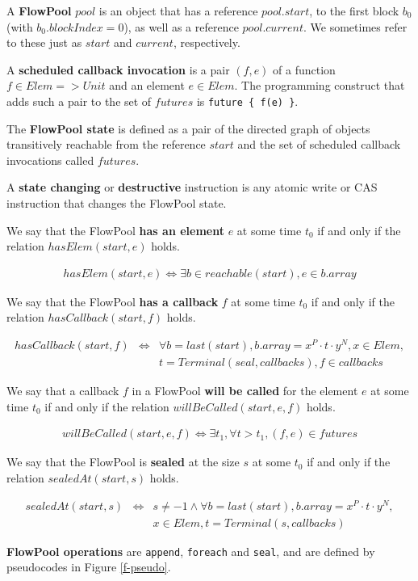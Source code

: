 \vspace{-1cm}
\begin{definitiontwo}[FlowPool]
A \textbf{FlowPool} $pool$ is an object that
has a reference $pool.start$, to the first block $b_0$ (with $b_0.blockIndex=0$),
as well as a reference $pool.current$.
We sometimes refer to these just as $start$ and $current$, respectively.

A \textbf{scheduled callback invocation} is a pair $(f, e)$ of a function
$f \in Elem => Unit$ and an element $e \in Elem$.
The programming construct that adds such a pair to the set of
$futures$ is \verb=future { f(e) }=.

The \textbf{FlowPool state} is defined as a pair of the directed graph of
objects transitively reachable from the reference $start$ and the set
of scheduled callback invocations called $futures$.

A \textbf{state changing} or \textbf{destructive} instruction is any
atomic write or CAS instruction that changes the FlowPool state.

We say that the FlowPool \textbf{has an element} $e$ at some time
$t_0$ if and only if the relation $hasElem(start, e)$ holds.

\vspace{-1cm}
\begin{align*}
hasElem(start, e) \Leftrightarrow \exists b \in reachable(start), e
\in b.array
\end{align*}

We say that the FlowPool \textbf{has a callback} $f$ at some time
$t_0$ if and only if the relation $hasCallback(start, f)$ holds.

\vspace{-1cm}
\begin{align*}
hasCallback(start, f) &\Leftrightarrow& \forall b = last(start), b.array
= x^P \cdot t \cdot y^N, x \in Elem, \\
& & t = Terminal(seal, callbacks), f \in callbacks
\end{align*}

We say that a callback $f$ in a FlowPool \textbf{will be called} for
the element $e$ at some time $t_0$ if and only if the relation
$willBeCalled(start, e, f)$ holds.

\begin{align*}
willBeCalled(start, e, f) \Leftrightarrow \exists t_1, \forall t >
t_1, (f, e) \in futures
\end{align*}

We say that the FlowPool is \textbf{sealed} at the size $s$ at some
$t_0$ if and only if the relation $sealedAt(start, s)$ holds.

\vspace{-1cm}
\begin{align*}
sealedAt(start, s) &\Leftrightarrow& s \neq -1 \wedge \forall b = last(start), b.array
= x^P \cdot t \cdot y^N, \\
& &x \in Elem, t = Terminal(s, callbacks)
\end{align*}

\textbf{FlowPool operations} are \verb=append=, \verb=foreach= and
\verb=seal=, and are defined by pseudocodes in Figure \ref{f-pseudo}.
\end{definitiontwo}


